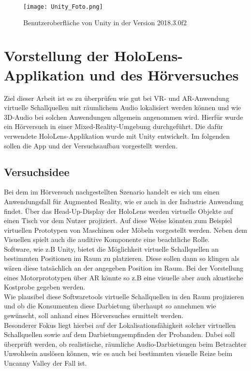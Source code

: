   \begin{figure}[H]
\centering
\texttt{[image: Unity\_Foto.png]}
\caption{Benutzeroberfläche von Unity in der Version 2018.3.0f2}
\label{fig:Unity}
\end{figure} 


\chapter{Vorstellung der HoloLens-Applikation und des Hörversuches}

Ziel dieser Arbeit ist es zu überprüfen wie gut bei VR- und AR-Anwendung virtuelle Schallquellen mit räumlichem Audio lokalisiert werden können und wie 3D-Audio bei solchen Anwendungen allgemein angenommen wird. Hierfür wurde ein Hörversuch in einer Mixed-Reality-Umgebung durchgeführt. Die dafür verwendete HoloLens-Applikation wurde mit Unity entwickelt. Im folgenden sollen die App und der Versuchsaufbau vorgestellt werden. 


 \section{Versuchsidee}
 
 Bei dem im Hörversuch nachgestellten Szenario handelt es sich um einen Anwendungsfall für Augmented Reality, wie er auch in der Industrie Anwendung findet. Über das Head-Up-Display der HoloLens werden virtuelle Objekte auf einen Tisch vor dem Nutzer projiziert. Auf diese Weise könnten zum Beispiel virtuellen Prototypen von Maschinen oder Möbeln vorgestellt werden. Neben dem Visuellen spielt auch die auditive Komponente eine beachtliche Rolle.\\ 
 
Software, wie z.B Unity, bietet die Möglichkeit virtuelle Schallquellen an bestimmten Positionen im Raum zu platzieren. Diese sollen dann so klingen als wären diese tatsächlich an der angegeben Position im Raum.  Bei der Vorstellung eines Motorprototypen über AR könnte so z.B eine visuelle aber auch akustische Kostprobe gegeben werden. \\
 
 Wie plausibel diese Softwaretools virtuelle Schallquellen in den Raum projizieren und ob die Konsumenten diese Darbietung überhaupt so annehmen wie gewünscht, soll anhand eines Hörversuches ermittelt werden. \\ 

Besonderer Fokus liegt hierbei auf der Lokalisationsfähigkeit solcher virtuellen Schallquellen sowie auf dem Darbietungsempfinden der Probanden. Dabei soll überprüft werden, ob realistische, räumliche Audio-Darbietungen beim Betrachter Unwohlsein auslösen können, wie es auch bei bestimmten visuelle Reize beim \glqq  Uncanny Valley\grqq{} der Fall ist. 
 
